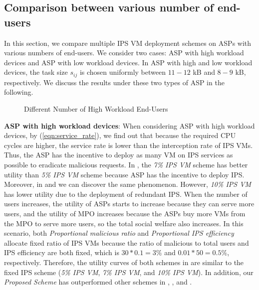 \documentclass[10pt,journal, compsoc]{IEEEtran}
\begin{document}
\subsection{Comparison between various number of end-users}
In this section, we compare multiple IPS VM deployment schemes on ASPs with various numbers of end-users. We consider two cases: ASP with high workload devices and ASP with low workload devices. In ASP with high and low workload devices, the task size $s_{ij}$ is chosen uniformly between $11 - 12$ kB and $8 - 9$ kB, respectively. We discuss the results under these two types of ASP in the following. 
\begin{figure}[!]
\captionsetup{justification=centering}
  \hfill
  \hfill
\label{fig:num_cmp_high}
\caption{Different Number of High Workload End-Users}
\end{figure}

\textbf{ASP with high workload devices}: 
When considering ASP with high workload devices, by (\ref{eqn:service_rate}), we find out that because the required CPU cycles are higher, the service rate is lower than the interception rate of IPS VMs. Thus, the ASP has the incentive to deploy as many VM on IPS services as possible to eradicate malicious requests. In , the \textit{7\% IPS VM} scheme has better utility than \textit{5\% IPS VM} scheme because ASP has the incentive to deploy IPS. Moreover, in  and  we can discover the same phenomenon. However, \textit{10\% IPS VM} has lower utility due to the deployment of redundant IPS. When the number of users increases, the utility of ASPs starts to increase because they can serve more users, and the utility of MPO increases because the ASPs buy more VMs from the MPO to serve more users, so the total social welfare also increases. In this scenario, both \textit{Proportional malicious ratio} and \textit{Proportional IPS efficiency} allocate fixed ratio of IPS VMs because the ratio of malicious to total users and IPS efficiency are both fixed, which is $30 * 0.1 = 3\%$ and $0.01 * 50 = 0.5\%$, respectively. Therefore, the utility curves of both schemes in  are similar to the fixed IPS scheme (\textit{5\% IPS VM}, \textit{7\% IPS VM}, and \textit{10\% IPS VM}). In addition, our \textit{Proposed Scheme} has outperformed other schemes in , , and .
\end{document}
